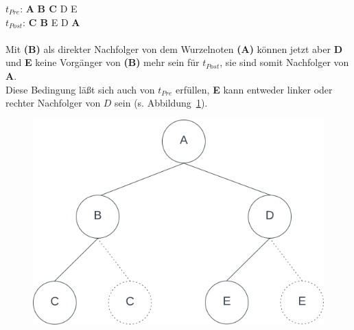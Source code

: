 \noindent
$t_{Pre}$: \textbf{A} \textbf{B C} D E\\
$t_{Post}$: \textbf{C B} E D \textbf{A}\\

\\
Mit \textbf{(B)} als direkter Nachfolger von dem Wurzelnoten \textbf{(A)} können jetzt aber \textbf{D} und \textbf{E} keine Vorgänger von \textbf{(B)} mehr sein für $t_{Post}$, sie sind somit Nachfolger von \textbf{A}.\\
Diese Bedingung läßt sich auch von $t_{Pre}$ erfüllen, \textbf{E} kann entweder linker oder rechter Nachfolger von $D$ sein (s. Abbildung~\ref{fig:tree_abcde}).\\


\begin{figure}
    \begin{center}
        \includegraphics[scale=0.5]{chapters/5. Binäre Bäume/img/abcde}
        \caption{}
        \label{fig:tree_abcde}
    \end{center}
\end{figure}




